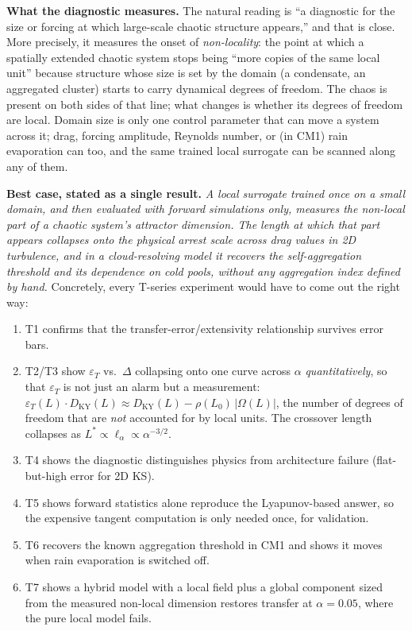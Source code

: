 \documentclass[11pt]{article}
\begin{document}
\textbf{What the diagnostic measures.} The natural reading is ``a
diagnostic for the size or forcing at which large-scale chaotic structure
appears,'' and that is close. More precisely, it measures the onset of
\emph{non-locality}: the point at which a spatially extended chaotic system
stops being ``more copies of the same local unit'' because structure whose
size is set by the domain (a condensate, an aggregated cluster) starts to
carry dynamical degrees of freedom. The chaos is present on both sides of
that line; what changes is whether its degrees of freedom are local.
Domain size is only one control parameter that can move a system across
it; drag, forcing amplitude, Reynolds number, or (in CM1) rain evaporation
can too, and the same trained local surrogate can be scanned along any of
them.

\textbf{Best case, stated as a single result.} \emph{A local surrogate
trained once on a small domain, and then evaluated with forward
simulations only, measures the non-local part of a chaotic system's
attractor dimension. The length at which that part appears collapses onto
the physical arrest scale across drag values in 2D turbulence, and in a
cloud-resolving model it recovers the self-aggregation threshold and its
dependence on cold pools, without any aggregation index defined by hand.}
Concretely, every T-series experiment would have to come out the right
way:
\begin{enumerate}[nosep]
\item T1 confirms that the transfer-error/extensivity relationship survives
  error bars.
\item T2/T3 show $\varepsilon_T$ vs.\ $\Delta$ collapsing onto one curve
  across $\alpha$ \emph{quantitatively}, so that $\varepsilon_T$ is not
  just an alarm but a measurement: $\varepsilon_T(L)\cdot D_{\mathrm{KY}}(L)
  \approx D_{\mathrm{KY}}(L)-\rho(L_0)\,|\Omega(L)|$, the number of
  degrees of freedom that are \emph{not} accounted for by local units. The
  crossover length collapses as $L^*\propto\ell_\alpha\propto\alpha^{-3/2}$.
\item T4 shows the diagnostic distinguishes physics from architecture
  failure (flat-but-high error for 2D KS).
\item T5 shows forward statistics alone reproduce the Lyapunov-based
  answer, so the expensive tangent computation is only needed once, for
  validation.
\item T6 recovers the known aggregation threshold in CM1 and shows it
  moves when rain evaporation is switched off.
\item T7 shows a hybrid model with a local field plus a global component
  sized from the measured non-local dimension restores transfer at
  $\alpha=0.05$, where the pure local model fails.
\end{enumerate}
\end{document}
